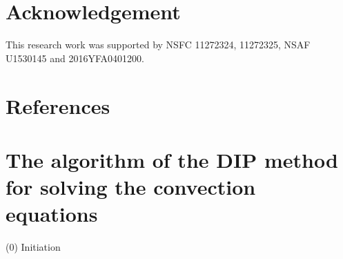 \documentclass{article}
\theoremstyle{plain}\newtheorem{definition}{\sc{Definition}}
\theoremstyle{defination}\newtheorem{example}{Example}[section]
\numberwithin{equation}{section}
\numberwithin{table}{section}
\begin{document}
%
\section*{Acknowledgement} 
This research work was supported by NSFC 11272324, 11272325, NSAF U1530145 and 2016YFA0401200.

\section*{References}



\newpage
  \appendix
  \renewcommand{\appendixname}{Appendix~}

  \section{The algorithm of the DIP method for solving the convection equations}
\large {\color{black!60!red!80!}}
  \color{black}

\hspace{-0.48cm}
\normalsize
(0) Initiation 
\vspace{0.1cm}
\end{document}
